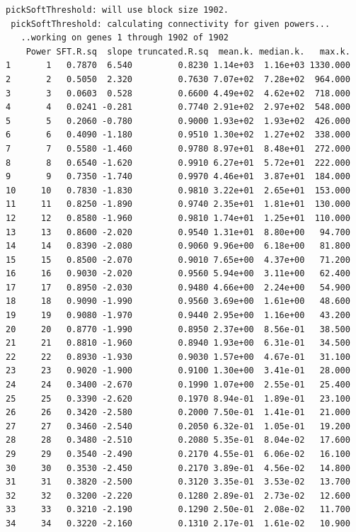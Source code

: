 \documentclass[
  letterpaper,
  DIV=11,
  numbers=noendperiod]{scrartcl}
\begin{document}
\begin{verbatim}
pickSoftThreshold: will use block size 1902.
 pickSoftThreshold: calculating connectivity for given powers...
   ..working on genes 1 through 1902 of 1902
    Power SFT.R.sq  slope truncated.R.sq  mean.k. median.k.   max.k.
1       1   0.7870  6.540         0.8230 1.14e+03  1.16e+03 1330.000
2       2   0.5050  2.320         0.7630 7.07e+02  7.28e+02  964.000
3       3   0.0603  0.528         0.6600 4.49e+02  4.62e+02  718.000
4       4   0.0241 -0.281         0.7740 2.91e+02  2.97e+02  548.000
5       5   0.2060 -0.780         0.9000 1.93e+02  1.93e+02  426.000
6       6   0.4090 -1.180         0.9510 1.30e+02  1.27e+02  338.000
7       7   0.5580 -1.460         0.9780 8.97e+01  8.48e+01  272.000
8       8   0.6540 -1.620         0.9910 6.27e+01  5.72e+01  222.000
9       9   0.7350 -1.740         0.9970 4.46e+01  3.87e+01  184.000
10     10   0.7830 -1.830         0.9810 3.22e+01  2.65e+01  153.000
11     11   0.8250 -1.890         0.9740 2.35e+01  1.81e+01  130.000
12     12   0.8580 -1.960         0.9810 1.74e+01  1.25e+01  110.000
13     13   0.8600 -2.020         0.9540 1.31e+01  8.80e+00   94.700
14     14   0.8390 -2.080         0.9060 9.96e+00  6.18e+00   81.800
15     15   0.8500 -2.070         0.9010 7.65e+00  4.37e+00   71.200
16     16   0.9030 -2.020         0.9560 5.94e+00  3.11e+00   62.400
17     17   0.8950 -2.030         0.9480 4.66e+00  2.24e+00   54.900
18     18   0.9090 -1.990         0.9560 3.69e+00  1.61e+00   48.600
19     19   0.9080 -1.970         0.9440 2.95e+00  1.16e+00   43.200
20     20   0.8770 -1.990         0.8950 2.37e+00  8.56e-01   38.500
21     21   0.8810 -1.960         0.8940 1.93e+00  6.31e-01   34.500
22     22   0.8930 -1.930         0.9030 1.57e+00  4.67e-01   31.100
23     23   0.9020 -1.900         0.9100 1.30e+00  3.41e-01   28.000
24     24   0.3400 -2.670         0.1990 1.07e+00  2.55e-01   25.400
25     25   0.3390 -2.620         0.1970 8.94e-01  1.89e-01   23.100
26     26   0.3420 -2.580         0.2000 7.50e-01  1.41e-01   21.000
27     27   0.3460 -2.540         0.2050 6.32e-01  1.05e-01   19.200
28     28   0.3480 -2.510         0.2080 5.35e-01  8.04e-02   17.600
29     29   0.3540 -2.490         0.2170 4.55e-01  6.06e-02   16.100
30     30   0.3530 -2.450         0.2170 3.89e-01  4.56e-02   14.800
31     31   0.3820 -2.500         0.3120 3.35e-01  3.53e-02   13.700
32     32   0.3200 -2.220         0.1280 2.89e-01  2.73e-02   12.600
33     33   0.3210 -2.190         0.1290 2.50e-01  2.08e-02   11.700
34     34   0.3220 -2.160         0.1310 2.17e-01  1.61e-02   10.900

\end{verbatim}
\end{document}
